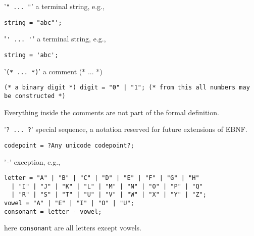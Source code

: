 \begin{description}
\item '\lstinline[language=ebnf]|" ... "|' a terminal string, e.g.,
  \begin{lstlisting}[language=ebnf]
string = "abc"';
  \end{lstlisting}
\item "\lstinline[language=ebnf]|' ... '|" a terminal string, e.g.,
  \begin{lstlisting}[language=ebnf]
string = 'abc';
  \end{lstlisting}
\item '\lstinline[language=ebnf]|(* ... *)|' a comment (* ... *) 
  \begin{lstlisting}[language=ebnf]
(* a binary digit *) digit = "0" | "1"; (* from this all numbers may be constructed *)
  \end{lstlisting}
  Everything inside the comments are not part of the formal definition.
\item '\lstinline[language=ebnf]|? ... ?|' special sequence, a notation reserved for future extensions of EBNF.
  \begin{lstlisting}[language=ebnf]
codepoint = ?Any unicode codepoint?;
  \end{lstlisting}
\item '\lstinline[language=ebnf]|-|' exception, e.g.,
  \begin{lstlisting}[language=ebnf]
letter = "A" | "B" | "C" | "D" | "E" | "F" | "G" | "H" 
  | "I" | "J" | "K" | "L" | "M" | "N" | "O" | "P" | "Q" 
  | "R" | "S" | "T" | "U" | "V" | "W" | "X" | "Y" | "Z";
vowel = "A" | "E" | "I" | "O" | "U"; 
consonant = letter - vowel;
  \end{lstlisting}
  here \lstinline[language=ebnf]|consonant| are all letters except vowels.
\end{description}


